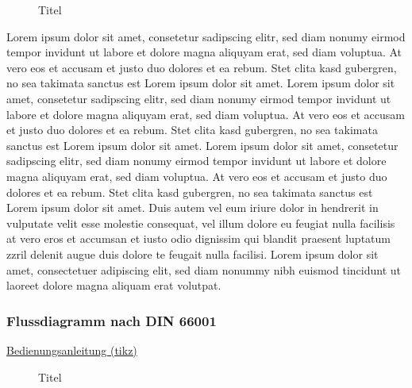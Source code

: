 \documentclass[a4paper, 11pt]{article}
\begin{document}
\par\medskip
\begin{wrapfigure}[11]{r}[0pt]{5cm}
    \centering
    \caption[Titel in Abbildungsverzeichnis (wrapfig)]{Titel\footnotemark}
    \label{fig:ExampleFloatImage}
\end{wrapfigure}
Lorem ipsum dolor sit amet, consetetur sadipscing elitr, sed diam nonumy eirmod tempor invidunt ut labore et dolore magna aliquyam erat, sed diam voluptua. At vero eos et accusam et justo duo dolores et ea rebum. Stet clita kasd gubergren, no sea takimata sanctus est Lorem ipsum dolor sit amet. Lorem ipsum dolor sit amet, consetetur sadipscing elitr, sed diam nonumy eirmod tempor invidunt ut labore et dolore magna aliquyam erat, sed diam voluptua. At vero eos et accusam et justo duo dolores et ea rebum. Stet clita kasd gubergren, no sea takimata sanctus est Lorem ipsum dolor sit amet. Lorem ipsum dolor sit amet, consetetur sadipscing elitr, sed diam nonumy eirmod tempor invidunt ut labore et dolore magna aliquyam erat, sed diam voluptua. At vero eos et accusam et justo duo dolores et ea rebum. Stet clita kasd gubergren, no sea takimata sanctus est Lorem ipsum dolor sit amet.
Duis autem vel eum iriure dolor in hendrerit in vulputate velit esse molestie consequat, vel illum dolore eu feugiat nulla facilisis at vero eros et accumsan et iusto odio dignissim qui blandit praesent luptatum zzril delenit augue duis dolore te feugait nulla facilisi. Lorem ipsum dolor sit amet, consectetuer adipiscing elit, sed diam nonummy nibh euismod tincidunt ut laoreet dolore magna aliquam erat volutpat.
\newpage

\subsubsection{Flussdiagramm nach DIN 66001}

\href{https://tikz.dev/}{Bedienungsanleitung (tikz)}

\par\medskip
\begin{figure}[!ht]
  \centering
  \caption[Titel in Abbildungsverzeichnis(Flowchart)]{Titel}
  \label{fig:ExampleFlowchart}
\end{figure}
\newpage
\end{document}
